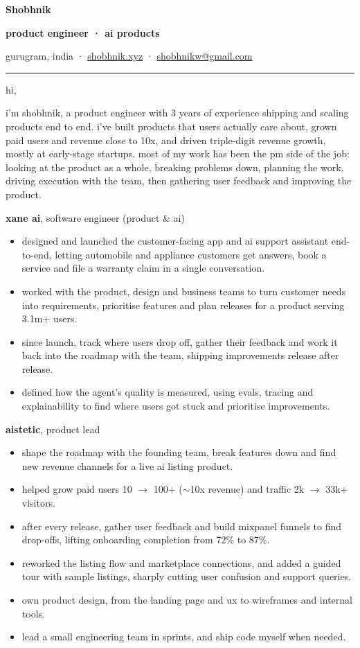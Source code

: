 \documentclass[10pt,a4paper]{article}
\newcommand{\heading}[1]{\vspace{4pt}{\color{accent}\footnotesize\bfseries\MakeUppercase{#1}}\par\vspace{-2pt}}
\newcommand{\lnk}[2]{\href{#1}{#2}}
\newcommand{\hr}{{\color{rulegray}\rule{\linewidth}{0.6pt}}}
\begin{document}
{\LARGE\bfseries Shobhnik}\par
\vspace{2pt}
{\color{accent}\bfseries product engineer · ai products}\par
{\color{muted}gurugram, india · \lnk{https://shobhnik.xyz}{shobhnik.xyz} · \lnk{mailto:shobhnikw@gmail.com}{shobhnikw@gmail.com}}\par
\vspace{-2pt}
\hr

hi,

i'm shobhnik, a product engineer with 3 years of experience shipping and scaling products end to end. i've built products that users actually care about, grown paid users and revenue close to 10x, and driven triple-digit revenue growth, mostly at early-stage startups. most of my work has been the pm side of the job: looking at the product as a whole, breaking problems down, planning the work, driving execution with the team, then gathering user feedback and improving the product.

\heading{what i've done}

\textbf{xane ai}, software engineer (product \& ai)
\begin{itemize}
\item designed and launched the customer-facing app and ai support assistant end-to-end, letting automobile and appliance customers get answers, book a service and file a warranty claim in a single conversation.
\item worked with the product, design and business teams to turn customer needs into requirements, prioritise features and plan releases for a product serving 3.1m+ users.
\item since launch, track where users drop off, gather their feedback and work it back into the roadmap with the team, shipping improvements release after release.
\item defined how the agent's quality is measured, using evals, tracing and explainability to find where users got stuck and prioritise improvements.
\end{itemize}

\textbf{aistetic}, product lead
\begin{itemize}
\item shape the roadmap with the founding team, break features down and find new revenue channels for a live ai listing product.
\item helped grow paid users 10 $\rightarrow$ 100+ ($\sim$10x revenue) and traffic 2k $\rightarrow$ 33k+ visitors.
\item after every release, gather user feedback and build mixpanel funnels to find drop-offs, lifting onboarding completion from 72\% to 87\%.
\item reworked the listing flow and marketplace connections, and added a guided tour with sample listings, sharply cutting user confusion and support queries.
\item own product design, from the landing page and ux to wireframes and internal tools.
\item lead a small engineering team in sprints, and ship code myself when needed.
\end{itemize}
\end{document}
